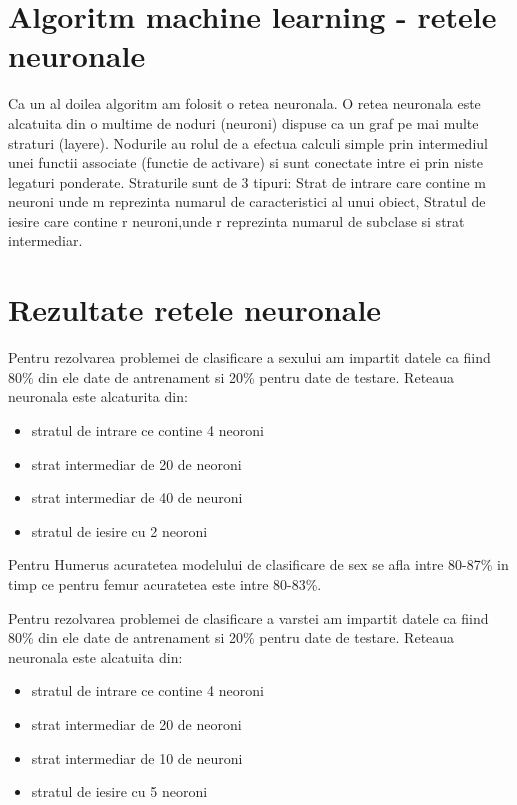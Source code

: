 \documentclass[runningheads,a4paper,11pt]{report}
\begin{document}
\section{Algoritm machine learning - retele neuronale}
\label{algoritmi}
Ca un al doilea algoritm am folosit o retea neuronala.
O retea neuronala este alcatuita din o multime de noduri (neuroni) dispuse ca un graf pe mai multe straturi (layere). Nodurile au rolul de a efectua calculi simple prin intermediul unei functii associate (functie de activare) si sunt conectate intre ei prin niste legaturi ponderate. Straturile sunt de 3 tipuri:  Strat de intrare care contine m neuroni unde m reprezinta numarul de caracteristici al unui obiect, Stratul de iesire care contine r neuroni,unde r reprezinta numarul de subclase si strat intermediar.

\section{Rezultate retele neuronale}
\label{rezultate}
Pentru rezolvarea problemei de clasificare a sexului am impartit datele ca fiind 80\% din ele date de antrenament si 20\% pentru date de testare. \newline
Reteaua neuronala este alcaturita din: 
\begin{itemize}
    \item stratul de intrare ce contine 4 neoroni
    \item strat intermediar de 20 de neoroni
    \item strat intermediar de 40 de neuroni
    \item stratul de iesire cu 2 neoroni
\end{itemize}

\noindent Pentru Humerus acuratetea modelului de clasificare de sex se afla intre 80-87\% in timp ce pentru femur acuratetea este intre 80-83\%. \newline

\noindent Pentru rezolvarea problemei de clasificare a varstei am impartit datele ca fiind 80\% din ele date de antrenament si 20\% pentru date de testare. Reteaua neuronala este alcatuita din:
\begin{itemize}
    \item stratul de intrare ce contine 4 neoroni
    \item strat intermediar de 20 de neoroni
    \item strat intermediar de 10 de neuroni
    \item stratul de iesire cu 5 neoroni
\end{itemize}
\end{document}
